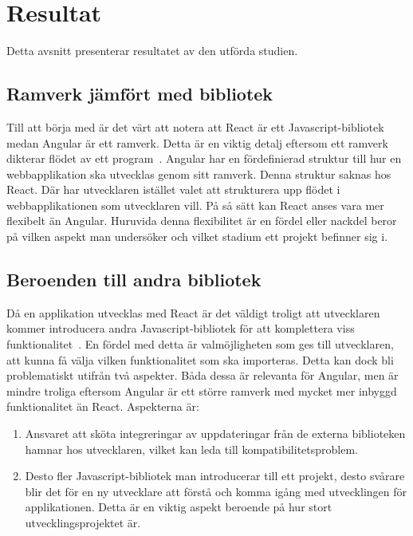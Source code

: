 \section{Resultat}
\label{sec:axel-results}
Detta avsnitt presenterar resultatet av den utförda studien.

\subsection{Ramverk jämfört med bibliotek}
Till att börja med är det värt att notera att React är ett Javascript-bibliotek medan Angular är ett ramverk. Detta är en viktig detalj eftersom ett ramverk dikterar flödet av ett program~\cite{medium}. Angular har en fördefinierad struktur till hur en webbapplikation ska utvecklas genom sitt ramverk. Denna struktur saknas hos React. Där har utvecklaren istället valet att strukturera upp flödet i webbapplikationen som utvecklaren vill. På så sätt kan React anses vara mer flexibelt än Angular. Huruvida denna flexibilitet är en fördel eller nackdel beror på vilken aspekt man undersöker och vilket stadium ett projekt befinner sig i. 

\subsection{Beroenden till andra bibliotek}
\label{beroenden-till-andra-bibliotek}
Då en applikation utvecklas med React är det väldigt troligt att utvecklaren kommer introducera andra Javascript-bibliotek för att komplettera viss funktionalitet~\cite{sitepoint}. En fördel med detta är valmöjligheten som ges till utvecklaren, att kunna få välja vilken funktionalitet som ska importeras. Detta kan dock bli problematiskt utifrån två aspekter. Båda dessa är relevanta för Angular, men är mindre troliga eftersom Angular är ett större ramverk med mycket mer inbyggd funktionalitet än React. Aspekterna är:

\begin{enumerate}
    \item Ansvaret att sköta integreringar av uppdateringar från de externa biblioteken hamnar hos utvecklaren, vilket kan leda till kompatibilitetsproblem.

    \item Desto fler Javascript-bibliotek man introducerar till ett projekt, desto svårare blir det för en ny utvecklare att förstå och komma igång med utvecklingen för applikationen. Detta är en viktig aspekt beroende på hur stort utvecklingsprojektet är.
\end{enumerate}



